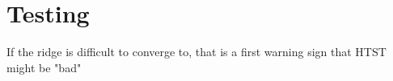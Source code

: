 \section{Testing}
\label{sec:erm-testing}

\eit
\item If the ridge is difficult to converge to, that is a first warning sign that HTST might be "bad"
\bit

\placeholder

